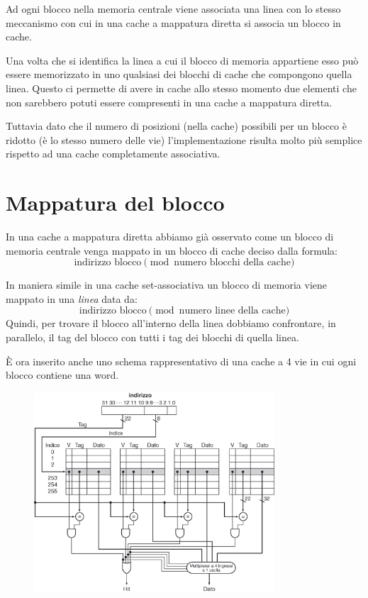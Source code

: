 \documentclass[class=book, crop=false, oneside]{standalone}
\begin{document}
Ad ogni blocco nella memoria centrale viene associata una linea con lo stesso meccanismo con cui in una cache a mappatura diretta si associa un blocco in cache.

Una volta che si identifica la linea a cui il blocco di memoria appartiene esso può essere memorizzato in uno qualsiasi dei blocchi di cache che compongono quella linea. Questo ci permette di avere in cache allo stesso momento due elementi che non sarebbero potuti essere compresenti in una cache a mappatura diretta.

Tuttavia dato che il numero di posizioni (nella cache) possibili per un blocco è ridotto (è lo stesso numero delle vie) l'implementazione risulta molto più semplice rispetto ad una cache completamente associativa.

\section{Mappatura del blocco}
In una cache a mappatura diretta abbiamo già osservato come un blocco di memoria centrale venga mappato in un blocco di cache deciso dalla formula:
\begin{equation*}
	\textrm{indirizzo blocco} \pmod{\textrm{numero blocchi della cache}}
\end{equation*}

In maniera simile in una cache set-associativa un blocco di memoria viene mappato in una \emph{linea} data da:
\begin{equation*}
	\textrm{indirizzo blocco} \pmod{\textrm{numero linee della cache}}
\end{equation*}
Quindi, per trovare il blocco all’interno della linea dobbiamo confrontare, in parallelo, il tag del blocco con tutti i tag dei blocchi di quella linea.

È ora inserito anche uno schema rappresentativo di una cache a 4 vie in cui ogni blocco contiene una word.

\begin{figure}[!h]
	\centering
	\includegraphics[width=0.8\textwidth,keepaspectratio]{4-vie}
\end{figure}
\end{document}
